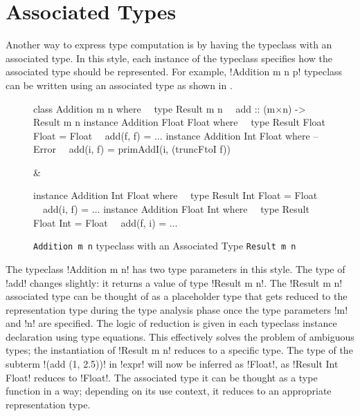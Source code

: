 \documentclass[format=acmsmall,manuscript,screen,nonacm,margin=1in,11pt]{acmart}
\begin{document}
\section{Associated Types}\label{sec:assoc-types}
Another way to express type computation is by having the typeclass with
an associated type\cite{chakravarty_associated_2005}.
In this style, each instance of the typeclass specifies how the associated type should be represented.
For example, !Addition m n p! typeclass can be written using an associated type as shown in .
\begin{figure}[ht]\centering
  \footnotesize
  \begin{tabularx}\textwidth{X X}
\begin{code}^^J
class Addition m n where^^J
\ \ type Result m n^^J
\ \ add :: (m$\times$n) -> Result m n^^J
^^J
instance Addition Float Float where^^J
\ \ type Result Float Float = Float^^J
\ \ add(f, f) = $\ldots$^^J
^^J
instance Addition Int Float where -- Error^^J
\ \  add(i, f) = primAddI(i, (truncFtoI f))^^J
\end{code}&%
\begin{code}^^J
instance Addition Int Float where^^J
\ \  type Result Int Float = Float^^J
\ \  add(i, f) = $\ldots$^^J
^^J
instance Addition Float Int where^^J
\ \  type Result Float Int  = Float^^J
\ \  add(f, i) = $\ldots$
\end{code}
  \end{tabularx}
  \caption{\texttt{Addition m n} typeclass with an Associated Type \texttt{Result m n}}
  \label{fig:add-assoc-type}
\end{figure}

The typeclass !Addition m n! has two type parameters in this style.
The type of !add! changes slightly: it returns a value of type !Result m n!.
The !Result m n! associated type can be thought of as a placeholder type
that gets reduced to the representation type during the type analysis phase
once the type parameters !m! and !n! are specified. The logic
of reduction is given in each typeclass instance declaration using type equations.
This effectively solves the problem of ambiguous types; the instantiation
of !Result m n! reduces to a specific type. The type of the subterm !(add (1, 2.5))!
in !expr! will now be inferred as !Float!, as
!Result Int Float! reduces to !Float!. The associated type
it can be thought as a type function in a way; depending on its use context,
it reduces to an appropriate representation type.
\end{document}
